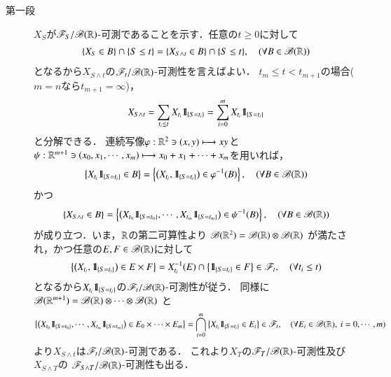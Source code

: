 	\begin{prf}\mbox{}
		\begin{description}
			\item[第一段]
				$X_S$が$\mathscr{F}_S/\mathscr{B}(\mathbb{R})$-可測であることを示す．任意の$t \geq 0$に対して
				\begin{align}
					\{X_S \in B\} \cap \{S \leq t\} = \{X_{S \wedge t} \in B\} \cap \{S \leq t\},
					\quad (\forall B \in \mathscr{B}(\mathbb{R}))
				\end{align}
				となるから$X_{S \wedge t}$の$\mathscr{F}_t/\mathscr{B}(\mathbb{R})$-可測性を言えばよい．
				$t_m \leq t < t_{m+1}$の場合($m=n$なら$t_{m+1} = \infty$)，
				\begin{align}
					X_{S \wedge t} = \sum_{t_i \leq t} X_{t_i} \mbox{1}\hspace{-0.25em}\mbox{l}_{\{S=t_i\}}
					= \sum_{i=0}^m X_{t_i} \mbox{1}\hspace{-0.25em}\mbox{l}_{\{S=t_i\}}
				\end{align}
				と分解できる．
				連続写像$\varphi:\mathbb{R}^2 \ni (x,y) \longmapsto xy$と
				$\psi:\mathbb{R}^{m+1} \ni (x_0,x_1,\cdots,x_m) \longmapsto x_0+x_1+\cdots+x_m$を用いれば，
				\begin{align}
					\left\{ X_{t_i}\mbox{1}\hspace{-0.25em}\mbox{l}_{\{S=t_i\}} \in B \right\}
					= \left\{ \left( X_{t_i}, \mbox{1}\hspace{-0.25em}\mbox{l}_{\{S=t_i\}} \right) \in \varphi^{-1}(B) \right\},
					\quad (\forall B \in \mathscr{B}(\mathbb{R}))
				\end{align}
				かつ
				\begin{align}
					\left\{ X_{S \wedge t} \in B \right\}
					= \left\{ \left( X_{t_0}\mbox{1}\hspace{-0.25em}\mbox{l}_{\{S=t_0\}},\cdots,X_{t_m}\mbox{1}\hspace{-0.25em}\mbox{l}_{\{S=t_m\}} \right) \in \psi^{-1}(B) \right\},
					\quad (\forall B \in \mathscr{B}(\mathbb{R}))
				\end{align}
				が成り立つ．いま，$\mathbb{R}$の第二可算性より
				$\mathscr{B}(\mathbb{R}^2) = \mathscr{B}(\mathbb{R}) \otimes \mathscr{B}(\mathbb{R})$
				が満たされ，かつ任意の$E,F \in \mathscr{B}(\mathbb{R})$に対して
				\begin{align}
					\left\{ \left( X_{t_i}, \mbox{1}\hspace{-0.25em}\mbox{l}_{\{S=t_i\}} \right) \in E \times F \right\}
					= X_{t_i}^{-1}(E) \cap \left\{ \mbox{1}\hspace{-0.25em}\mbox{l}_{\{S=t_i\}} \in F \right\}
					\in \mathscr{F}_t,
					\quad (\forall t_i \leq t)
				\end{align}
				となるから$X_{t_i} \mbox{1}\hspace{-0.25em}\mbox{l}_{\{S=t_i\}}$の$\mathscr{F}_t/\mathscr{B}(\mathbb{R})$-可測性が従う．
				同様に
				$\mathscr{B}(\mathbb{R}^{m+1}) = \mathscr{B}(\mathbb{R}) \otimes \cdots \otimes \mathscr{B}(\mathbb{R})$
				と
				\begin{align}
					\left\{ \left( X_{t_0}\mbox{1}\hspace{-0.25em}\mbox{l}_{\{S=t_0\}},\cdots,X_{t_m}\mbox{1}\hspace{-0.25em}\mbox{l}_{\{S=t_m\}} \right) \in E_0 \times \cdots \times E_m \right\}
					= \bigcap_{i=0}^m \left\{X_{t_i}\mbox{1}\hspace{-0.25em}\mbox{l}_{\{S=t_i\}} \in E_i\right\}
					\in \mathscr{F}_t,
					\quad (\forall E_i \in \mathscr{B}(\mathbb{R}),\ i=0,\cdots,m)
				\end{align}
				より$X_{S \wedge t}$は$\mathscr{F}_t/\mathscr{B}(\mathbb{R})$-可測である．
				これより$X_T$の$\mathscr{F}_T/\mathscr{B}(\mathbb{R})$-可測性及び$X_{S \wedge T}$の
				$\mathscr{F}_{S \wedge T}/\mathscr{B}(\mathbb{R})$-可測性も出る．
				

\end{description}
\end{prf}
